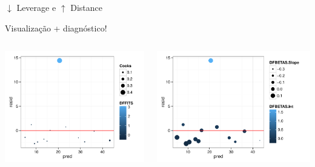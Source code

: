\documentclass{beamer}\usepackage[]{graphicx}\usepackage[]{color}
\newenvironment{knitrout}{}{} %
\renewenvironment{knitrout}{\setlength{\topsep}{0mm}}{}
\begin{document}
\begin{frame}{$\downarrow$ Leverage e $\uparrow$ Distance}

Visualização + diagnóstico!

\begin{columns}[c]

\begin{knitrout}
\color{fgcolor}
\includegraphics[width=1\linewidth]{figure/inf25-1} 

\end{knitrout}

\begin{knitrout}\tiny
{}\color{fgcolor}
\includegraphics[width=1\linewidth]{figure/inf26-1} 

\end{knitrout}

\end{columns}
\end{frame}
\end{document}
